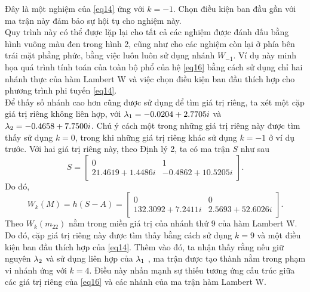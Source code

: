 Đây là một nghiệm của \eqref{eq14} ứng với $k = -1$. Chọn điều kiện ban đầu gần với ma trận này đảm bảo sự hội tụ cho nghiệm này.\\
Quy trình này có thể được lặp lại cho tất cả các nghiệm được đánh dấu bằng hình vuông màu đen trong hình 2, cũng như cho các nghiệm còn lại ở phía bên trái mặt phẳng phức, bằng việc luôn luôn sử dụng nhánh $W_{-1}$. Ví dụ này minh họa quá trình tính toán của toàn bộ phổ của hệ \eqref{eq16} bằng cách sử dụng chỉ hai nhánh thực của hàm Lambert W và việc chọn điều kiện ban đầu thích hợp cho phương trình phi tuyến \eqref{eq14}.\\
Để thấy số nhánh cao hơn cũng được sử dụng để tìm giá trị riêng, ta xét một cặp giá trị riêng không liên hợp, với $\lambda_1=-0.0204 + 2.7705i$ và $\lambda_2 = -0.4658 + 7.7500i$. Chú ý cách một trong những giá trị riêng này được tìm thấy sử dụng $k =0$, trong khi những giá trị riêng khác sử dụng $k = -1$ ở ví dụ trước. Với hai giá trị riêng này, theo Định lý 2, ta có ma trận $S$ như sau
\begin{equation*}
	S= \begin{bmatrix}
		0&1\\   21.4619 + 1.4486i & -0.4862 +10.5205i
	\end{bmatrix}.
\end{equation*}
Do đó,
\begin{equation} \label{eq42}
W_k(M)= h  (S-A) = \begin{bmatrix}
		0&0\\   132.3092 + 7.2411i &  2.5693 + 52.6026i	
	\end{bmatrix}.
\end{equation}
Theo \cite{Cor96} $W_k(m_{22})$ nằm trong miền giá trị của nhánh thứ $9$ của hàm Lambert W. Do đó, cặp giá trị riêng này được tìm thấy bằng cách sử dụng $k = 9$ và một điều kiện ban đầu thích hợp của \eqref{eq14}. Thêm vào đó, ta nhận thấy rằng nếu giữ nguyên $\lambda_2$ và sử dụng liên hợp của $\lambda_1$ , ma trận được tạo thành nằm trong phạm vi nhánh ứng với $k =4$. Điều này nhấn mạnh sự thiếu tương ứng cấu trúc giữa các giá trị riêng của \eqref{eq16} và các nhánh của ma trận hàm Lambert W.

